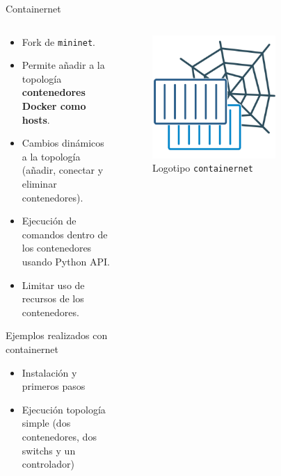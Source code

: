 \documentclass[aspectratio=169,xcolor=dvipsnames]{beamer}
\begin{document}
	\begin{frame}{Containernet}
	
	    \begin{columns}
	        \begin{column}{0.6\textwidth}
	        \begin{itemize}
	            \item Fork de \texttt{mininet}.
	            \item Permite añadir a la topología \textbf{contenedores Docker como hosts}.
	            \item Cambios dinámicos a la topología (añadir, conectar y eliminar contenedores).
	            \item Ejecución de comandos dentro de los contenedores usando Python API.
	            \item Limitar uso de recursos de los contenedores.
	        \end{itemize}
	        
	        \begin{alertblock}{Ejemplos realizados con containernet}
	        \begin{itemize}
	            \item Instalación y primeros pasos
	            \item Ejecución topología simple (dos contenedores, dos switchs y un controlador)
	        \end{itemize}
	        \end{alertblock}
	        \end{column}
	        
	        \begin{column}{0.4\textwidth}
	        \begin{figure}[h]
            \includegraphics[width=0.7\textwidth]{img/containernet_logo.png}
            \caption{Logotipo \texttt{containernet}}
            \end{figure}
	        \end{column}
	    \end{columns}
	\end{frame}
\end{document}

